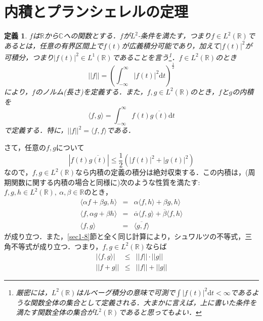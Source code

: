 \documentclass[a4j]{jsbook}
\newtheorem{definition}[theorem]{定義}
\numberwithin{theorem}{chapter}  %
\begin{document}
\section{内積とプランシェレルの定理} \label{sec3-5}
\begin{definition}
\label{def3-3}
\(f\)は\(\mathbb{R}\)から\(\mathbb{C}\)への関数とする．\(f\)が\(L^2\)-条件を満たす，つまり\(f\in L^2(\mathbb{R})\)であるとは，任意の有界区間上で\(f(t)\)が広義積分可能であり，加えて\(|f(t)|^2\)が可積分，つまり\(|f(t)|^2\in L^1(\mathbb{R})\)であることを言う\footnote{厳密には，\(L^2(\mathbb{R})\)はルベーグ積分の意味で可測で\(\displaystyle\int|f(t)|^2\mathrm{d}t<\infty\)であるような関数全体の集合として定義される．大まかに言えば，上に書いた条件を満たす関数全体の集合が\(L^2(\mathbb{R})\)であると思ってもよい．}．\(f\in L^2(\mathbb{R})\)のとき
\begin{equation*}
    ||f||=\left(\int_{-\infty}^\infty|f(t)|^2\mathrm{d}t\right)^{\frac{1}{2}}
\end{equation*}
により，\(f\)のノルム(長さ)を定義する．また，\(f, g\in L^2(\mathbb{R})\)のとき，\(f\)と\(g\)の内積を
\begin{equation*}
    \langle f, g\rangle=\int_{-\infty}^\infty f(t)\overline{g(t)}\mathrm{d}t
\end{equation*}
で定義する．特に，\(||f||^2=\langle f, f\rangle\)である．
\end{definition}
さて，任意の\(f, g\)について
\begin{equation*}
    \left|f(t)\overline{g(t)}\right|\leq\frac{1}{2}\left(|f(t)|^2+|g(t)|^2\right)
\end{equation*}
なので，\(f, g\in L^2(\mathbb{R})\)なら内積の定義の積分は絶対収束する．この内積は，(周期関数に関する内積の場合と同様に)次のような性質を満たす: \(f, g, h\in L^2(\mathbb{R}),\ \alpha, \beta\in\mathbb{R}\)のとき，
\begin{eqnarray*}
\langle\alpha f+\beta g, h\rangle&=&\alpha\langle f, h\rangle+\beta g, h\rangle \\
\langle f, \alpha g+\beta h\rangle&=&\overline{\alpha}\langle f, g\rangle+\overline{\beta}\langle f, h\rangle \\
\langle f, g\rangle&=&\overline{\langle g, f\rangle}
\end{eqnarray*}
が成り立つ．また，\ref{sec1-8}節と全く同じ計算により，シュワルツの不等式，三角不等式が成り立つ．つまり，\(f, g\in L^2(\mathbb{R})\)ならば
\begin{eqnarray*}
|\langle f, g\rangle|&\leq&||f||\cdot||g|| \\
||f+g||&\leq&||f||+||g||
\end{eqnarray*}
\end{document}

